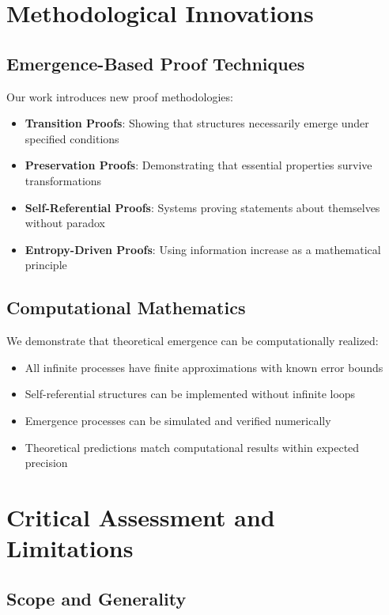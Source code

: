 \documentclass[12pt]{article}
\theoremstyle{plain}
\theoremstyle{definition}
\begin{document}
\section{Methodological Innovations}

\subsection{Emergence-Based Proof Techniques}

Our work introduces new proof methodologies:

\begin{itemize}
\item \textbf{Transition Proofs}: Showing that structures necessarily emerge under specified conditions
\item \textbf{Preservation Proofs}: Demonstrating that essential properties survive transformations
\item \textbf{Self-Referential Proofs}: Systems proving statements about themselves without paradox
\item \textbf{Entropy-Driven Proofs}: Using information increase as a mathematical principle
\end{itemize}

\subsection{Computational Mathematics}

We demonstrate that theoretical emergence can be computationally realized:

\begin{itemize}
\item All infinite processes have finite approximations with known error bounds
\item Self-referential structures can be implemented without infinite loops
\item Emergence processes can be simulated and verified numerically
\item Theoretical predictions match computational results within expected precision
\end{itemize}

\section{Critical Assessment and Limitations}

\subsection{Scope and Generality}
\end{document}
